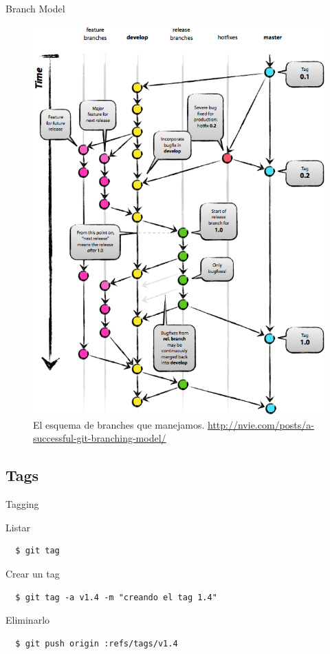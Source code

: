 \documentclass{beamer}
\begin{document}
\begin{frame}{Branch Model}
   \begin{figure}
    \includegraphics[scale=0.20]{branch-model.png} 
    \caption{El esquema de branches que manejamos. \url{http://nvie.com/posts/a-successful-git-branching-model/}}
  \end{figure}
\end{frame}

\subsection{Tags}

\begin{frame}[fragile]{Tagging}
  \begin{block}{Listar}
    \begin{verbatim}
  $ git tag
    \end{verbatim}
  \end{block} 
  \pause
  \begin{block}{Crear un tag}
    \begin{verbatim}
  $ git tag -a v1.4 -m "creando el tag 1.4"
    \end{verbatim}
  \end{block}
  \pause
  \begin{block}{Eliminarlo}
    \begin{verbatim}
  $ git push origin :refs/tags/v1.4
    \end{verbatim}
  \end{block}
\end{frame}
\end{document}
